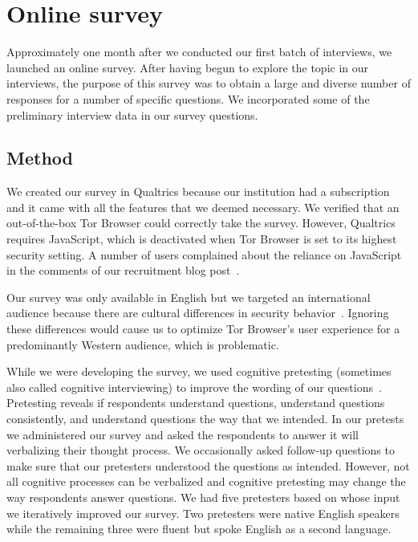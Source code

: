 \section{Online survey}
\label{sec:online-survey}

Approximately one month after we conducted our first batch of interviews, we
launched an online survey.  After having begun to explore the topic in our
interviews, the purpose of this survey was to obtain a large and diverse number
of responses for a number of specific questions.  We incorporated some of the
preliminary interview data in our survey questions.

\subsection{Method}
\label{sec:survey-design}

We created our survey in Qualtrics because our institution had a subscription
and it came with all the features that we deemed necessary.  We verified that an
out-of-the-box Tor Browser could correctly take the survey.  However, Qualtrics
requires JavaScript, which is deactivated when Tor Browser is set to its highest
security setting.  A number of users complained about the reliance on JavaScript
in the comments of our recruitment blog post~\cite{Winter2017a}.

Our survey was only available in English but we targeted an international
audience because there are cultural differences in security
behavior~\cite{Sawaya2017a}.  Ignoring these differences would cause us to
optimize Tor Browser's user experience for a predominantly Western audience,
which is problematic.

While we were developing the survey, we used cognitive pretesting (sometimes
also called cognitive interviewing) to improve the wording of our
questions~\cite{Collins2003a}.  Pretesting reveals if respondents \first
understand questions, \second understand questions consistently, and \third
understand questions the way that we intended.  In our pretests we administered
our survey and asked the respondents to answer it will verbalizing their thought
process.  We occasionally asked follow-up questions to make sure that our
pretesters understood the questions as intended.  However, not all cognitive
processes can be verbalized and cognitive pretesting may change the way
respondents answer questions.  We had five pretesters based on whose input we
iteratively improved our survey.  Two pretesters were native English speakers
while the remaining three were fluent but spoke English as a second language.

